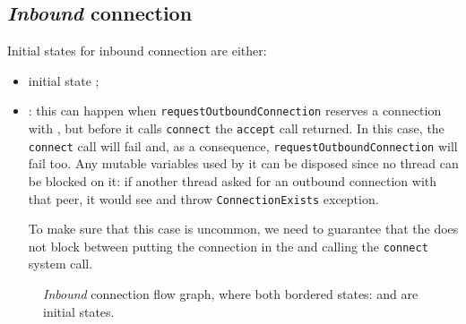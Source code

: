\subsection{\textit{Inbound} connection}
Initial states for inbound connection are either:
\begin{itemize}
  \item initial state \InitialState{};
  \item \ReservedOutboundState{}:
    this can happen when \texttt{requestOutboundConnection}
    reserves a connection with \ReservedOutboundState{}, but before it calls
    \texttt{connect} the \texttt{accept} call returned.  In this case, the
    \texttt{connect} call will fail and, as a consequence,
    \texttt{requestOutboundConnection} will fail too. Any mutable variables
    used by it can be disposed since no thread can be blocked
    on it: if another thread asked for an outbound connection
    with that peer, it would see \ReservedOutboundState{} and throw
    \texttt{ConnectionExists} exception.

    To make sure that this case is uncommon, we need to guarantee that the
    \connmngr{} does not block between putting the connection in the
    \ReservedOutboundState{} and calling the \texttt{connect} system call.
\end{itemize}

\begin{figure}[h]
  \footnotesize{}
  \caption{\textit{Inbound} connection flow graph, where both bordered states:
  \ReservedOutboundState{} and \UnnegotiatedStateIn{} are initial states.}
\end{figure}

